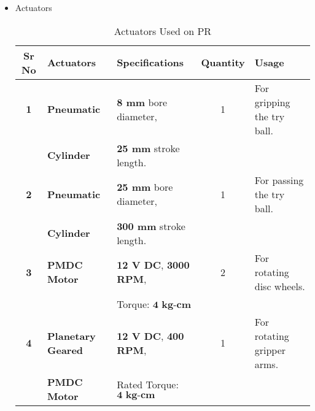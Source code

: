 \begin{itemize}
            \item Actuators
            \begin{table}[h]
                \caption {Actuators Used on PR} \label{Actuators_PR}  \small
                \begin{tabular}{|c|l|l|c|l|}
                    \hline  \hline
                    \textbf{Sr No}  & \textbf{Actuators}        & \textbf{Specifications}               & \textbf{Quantity}  & \textbf{Usage}                                               \\ \hline   \hline
                    \textbf{1}      & \textbf{Pneumatic}        & \textbf{8 mm} bore diameter,          & 1                  & For gripping the try ball.                                    \\
                                    & \textbf{Cylinder}         & \textbf{25 mm} stroke length.         &                    &                                                              \\ \hline
                    \textbf{2}      & \textbf{Pneumatic}        & \textbf{25 mm} bore diameter,         & 1                  & For passing the try ball.                                    \\
                                    & \textbf{Cylinder}         & \textbf{300 mm} stroke length.        &                    &                                                              \\ \hline                                  
                    \textbf{3}      & \textbf{PMDC Motor}       & \textbf{12 V DC},  \textbf{3000 RPM}, & 2                  & For rotating disc wheels.                                     \\
                                    &                           & Torque: $\textbf{4 kg-cm}$            &                    &                                                              \\ \hline 
                    \textbf{4}      & \textbf{Planetary Geared} & \textbf{12 V DC},  \textbf{400 RPM},  & 1                  & For rotating gripper arms.                                    \\
                                    & \textbf{PMDC Motor}       & Rated Torque: $\textbf{4 kg-cm}$      &                    &                                                              \\ \hline   \hline   
                \end{tabular}
            \end{table}
        \end{itemize}


